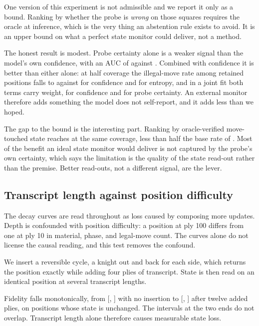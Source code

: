 One version of this experiment is not admissible and we report it only as a
bound. Ranking by whether the probe is \emph{wrong} on those squares requires the
oracle at inference, which is the very thing an abstention rule exists to avoid.
It is an upper bound on what a perfect state monitor could deliver, not a method.

The honest result is modest. Probe certainty alone is a weaker signal than the
model's own confidence, with an AUC of  against
. Combined with confidence it is better than either alone: at
half coverage the illegal-move rate among retained positions falls to
 against  for confidence and
 for entropy, and in a joint fit both terms carry weight,
 for confidence and  for probe certainty.
An external monitor therefore adds something the model does not self-report, and
it adds less than we hoped.

The gap to the bound is the interesting part. Ranking by oracle-verified
move-touched state reaches  at the same coverage, less than
half the base rate of . Most of the benefit an ideal state monitor
would deliver is not captured by the probe's own certainty, which says the
limitation is the quality of the state read-out rather than the premise. Better
read-outs, not a different signal, are the lever.


\subsection{Transcript length against position difficulty}
\label{sec:cycles}

The decay curves are read throughout as loss caused by composing more updates.
Depth is confounded with position difficulty: a position at ply 100 differs from
one at ply 10 in material, phase, and legal-move count. The curves alone do not
license the causal reading, and this test removes the confound.

We insert a reversible cycle, a knight out and back for each side, which returns
the position exactly while adding four plies of transcript. State is then read on
an identical position at several transcript lengths.



Fidelity falls monotonically, from  [,
] with no insertion to  [,
] after twelve added plies, on  positions whose
state is unchanged. The intervals at the two ends do not overlap. Transcript
length alone therefore causes measurable state loss.

